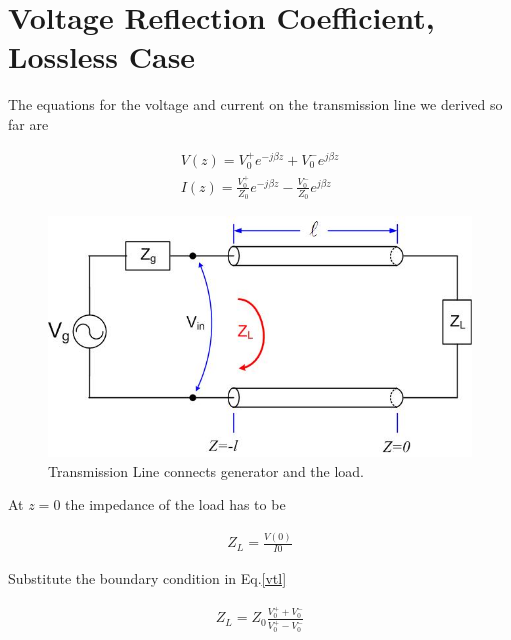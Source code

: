 \documentclass{ximera}
\begin{document}
\section{Voltage Reflection Coefficient, Lossless Case}

The equations for the voltage and current on the transmission line we
derived so far are

\begin{eqnarray}
V(z)=V_0^+ e^{-j \beta z} +V_0^- e^{j \beta z} \label{vtl} \\ \label{ctl}
I(z)=\frac{V_0^+}{Z_0} e^{- j \beta z} - \frac{V_0^-}{Z_0} e^{j \beta z}
\end{eqnarray}



\begin{figure}[htbp]
\begin{center}
\includegraphics[scale=0.3]{../jpg/trline.jpg}
\end{center}
\caption{Transmission Line connects generator and the load.}
\label{wind1}
\end{figure}





At $z=0$ the impedance of the load has to be

\begin{eqnarray}
Z_L=\frac{V(0)}{I{0}} \nonumber 
\end{eqnarray}

Substitute the boundary condition in Eq.\ref{vtl}

\begin{eqnarray}
Z_L=Z_0 \frac{V_0^+ + V_0^-}{V_0^+ - V_0^-}
\end{eqnarray}
\end{document}
